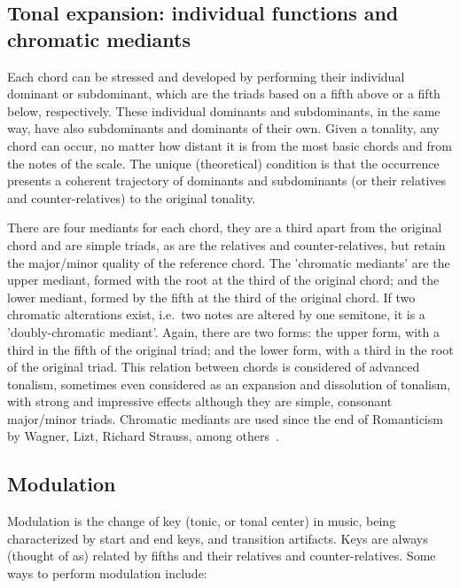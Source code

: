 \documentclass[format=acmsmall, review=false, screen=true]{acmart}
\begin{document}
\subsection{Tonal expansion: individual functions and chromatic mediants}
Each chord can be stressed and developed by performing their individual dominant or subdominant, which are the triads based
on a fifth above or a fifth below, respectively. These individual dominants and subdominants,
in the same way, have also subdominants and dominants of their own. Given a tonality, any chord can occur, no matter
how distant it is from the most basic chords and from the notes of the scale.
The unique (theoretical) condition is that the occurrence presents a coherent trajectory of dominants and subdominants (or their relatives and counter-relatives) to the original tonality.

There are four mediants for each chord,
they are a third apart from the original chord and are simple triads,
as are the relatives and counter-relatives,
but retain the major/minor quality of the reference chord.
The
'chromatic mediants'
are the upper mediant, formed with the root at the third of the original chord;
and the lower mediant, formed by the fifth at the third of the original chord.
If two chromatic alterations exist, i.e.\ two notes are altered by one semitone,
it is a 'doubly-chromatic mediant'.
Again, there are two forms: 
the upper form, with a third in the fifth of the original triad; and the lower form, with a third in the root
of the original triad.
This relation between chords is considered of advanced tonalism, sometimes even considered as an expansion and dissolution of tonalism,
with strong and impressive effects although they are simple, consonant major/minor triads.
Chromatic mediants are used since the end of Romanticism by Wagner, Lizt, Richard Strauss, among others~\cite{Harmonia,Salzer}. 


\subsection{Modulation}
Modulation is the change of key (tonic, or tonal center) in music, being characterized by start and end keys, and transition artifacts.
Keys are always (thought of as) related by fifths and their relatives and counter-relatives. Some ways to perform modulation include:
\end{document}

